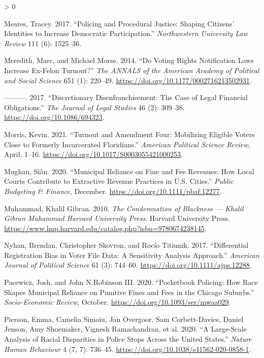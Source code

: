 \documentclass[
  12pt,
]{article}
\newlength{\cslhangindent}
\newenvironment{CSLReferences}[2] %
 {%
  \setlength{\parindent}{0pt}
  \ifodd #1 \everypar{\setlength{\hangindent}{\cslhangindent}}\ignorespaces\fi
  \ifnum #2 > 0
  \setlength{\parskip}{#2\baselineskip}
  \fi
 }%
 {}
\begin{document}
\begin{CSLReferences}{1}{0}
\leavevmode\hypertarget{ref-Meares2017}{}%
Meares, Tracey. 2017. {``Policing and {Procedural Justice}: {Shaping Citizens}' {Identities} to {Increase Democratic Participation}.''} \emph{Northwestern University Law Review} 111 (6): 1525--36.

\leavevmode\hypertarget{ref-Meredith2014}{}%
Meredith, Marc, and Michael Morse. 2014. {``Do {Voting Rights Notification Laws Increase Ex}-{Felon Turnout}?''} \emph{The ANNALS of the American Academy of Political and Social Science} 651 (1): 220--49. \url{https://doi.org/10.1177/0002716213502931}.

\leavevmode\hypertarget{ref-Meredith2017}{}%
---------. 2017. {``Discretionary {Disenfranchisement}: {The Case} of {Legal Financial Obligations}.''} \emph{The Journal of Legal Studies} 46 (2): 309--38. \url{https://doi.org/10.1086/694323}.

\leavevmode\hypertarget{ref-Morris2021}{}%
Morris, Kevin. 2021. {``Turnout and {Amendment Four}: {Mobilizing Eligible Voters Close} to {Formerly Incarcerated Floridians}.''} \emph{American Political Science Review}, April, 1--16. \url{https://doi.org/10.1017/S0003055421000253}.

\leavevmode\hypertarget{ref-Mughan2020}{}%
Mughan, Siân. 2020. {``Municipal {Reliance} on {Fine} and {Fee Revenues}: {How Local Courts Contribute} to {Extractive Revenue Practices} in {U}.{S}. {Cities}.''} \emph{Public Budgeting \& Finance}, December. \url{https://doi.org/10.1111/pbaf.12277}.

\leavevmode\hypertarget{ref-Muhammad2010}{}%
Muhammad, Khalil Gibran. 2010. \emph{The {Condemnation} of {Blackness} --- {Khalil Gibran Muhammad} \textbar{} {Harvard University Press}}. {Harvard University Press}. \url{https://www.hup.harvard.edu/catalog.php?isbn=9780674238145}.

\leavevmode\hypertarget{ref-Nyhan2017}{}%
Nyhan, Brendan, Christopher Skovron, and Rocío Titiunik. 2017. {``Differential {Registration Bias} in {Voter File Data}: {A Sensitivity Analysis Approach}.''} \emph{American Journal of Political Science} 61 (3): 744--60. \url{https://doi.org/10.1111/ajps.12288}.

\leavevmode\hypertarget{ref-Pacewicz2020}{}%
Pacewicz, Josh, and John N.Robinson III. 2020. {``Pocketbook Policing: {How} Race Shapes Municipal Reliance on Punitive Fines and Fees in the {Chicago} Suburbs.''} \emph{Socio-Economic Review}, October. \url{https://doi.org/10.1093/ser/mwaa029}.

\leavevmode\hypertarget{ref-Pierson2020}{}%
Pierson, Emma, Camelia Simoiu, Jan Overgoor, Sam Corbett-Davies, Daniel Jenson, Amy Shoemaker, Vignesh Ramachandran, et al. 2020. {``A Large-Scale Analysis of Racial Disparities in Police Stops Across the {United States}.''} \emph{Nature Human Behaviour} 4 (7, 7): 736--45. \url{https://doi.org/10.1038/s41562-020-0858-1}.


\end{CSLReferences}
\end{document}
